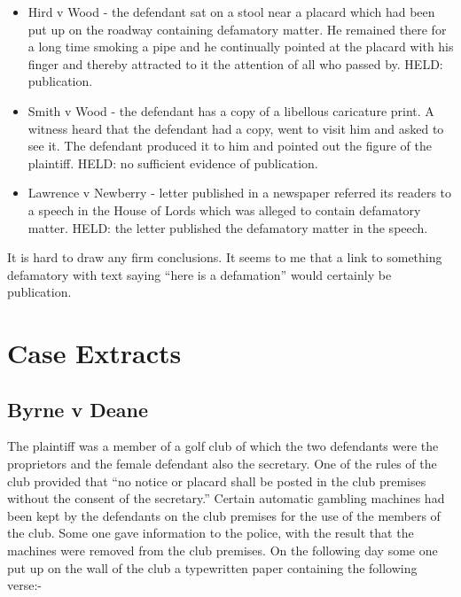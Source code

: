 \documentclass[]{article}
\begin{document}
\begin{itemize}
\item
  Hird v Wood - the defendant sat on a stool near a placard which had
  been put up on the roadway containing defamatory matter. He remained
  there for a long time smoking a pipe and he continually pointed at the
  placard with his finger and thereby attracted to it the attention of
  all who passed by. HELD: publication.
\item
  Smith v Wood - the defendant has a copy of a libellous caricature
  print. A witness heard that the defendant had a copy, went to visit
  him and asked to see it. The defendant produced it to him and pointed
  out the figure of the plaintiff. HELD: no sufficient evidence of
  publication.
\item
  Lawrence v Newberry - letter published in a newspaper referred its
  readers to a speech in the House of Lords which was alleged to contain
  defamatory matter. HELD: the letter published the defamatory matter in
  the speech.
\end{itemize}

It is hard to draw any firm conclusions. It seems to me that a link to
something defamatory with text saying ``here is a defamation'' would
certainly be publication.

\appendix
{}
\setcounter{secnumdepth}{1}
\section{Case Extracts}

\subsection{Byrne v Deane}

The plaintiff was a member of a golf club of which the two defendants
were the proprietors and the female defendant also the secretary. One of
the rules of the club provided that ``no notice or placard shall be
posted in the club premises without the consent of the secretary.''
Certain automatic gambling machines had been kept by the defendants on
the club premises for the use of the members of the club. Some one gave
information to the police, with the result that the machines were
removed from the club premises. On the following day some one put up on
the wall of the club a typewritten paper containing the following
verse:-
\end{document}
